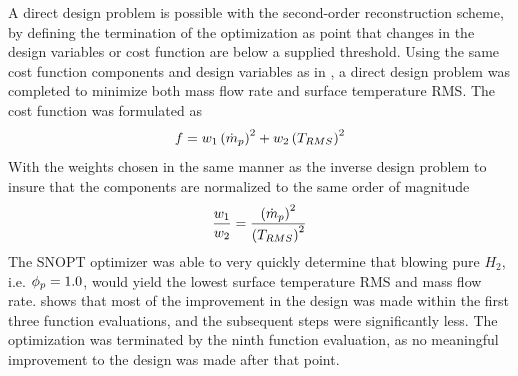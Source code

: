 A direct design problem is possible with the second-order reconstruction scheme,
by defining the termination of the optimization as point that changes in the
design variables or cost function are below a supplied threshold.  Using the
same cost function components and design variables as in ,
a direct design problem was completed to minimize both mass flow rate and
surface temperature RMS.  The cost function was formulated as
\begin{equation}
  f = w_1\left( \dot{m}_p \right)^2 + w_2\left( T_{RMS} \right)^2
  \label{direct-design-cost-func}
\end{equation}
With the weights chosen in the same manner as the inverse design problem to
insure that the components are normalized to the same order of magnitude
\begin{equation}
  \frac{w_1}{w_2} = \frac{\left( \dot{m}_p \right)^2}{\left( T_{RMS} \right)^2}
  \label{direct-design-weights}
\end{equation}
The SNOPT optimizer was able to very quickly determine that blowing pure
$H_2$, i.e. $\phi_p = 1.0$, would yield the lowest surface temperature RMS and mass
flow rate.   shows that most of the improvement in
the design was made within the first three function evaluations, and the
subsequent steps were significantly less.  The optimization was terminated by
the ninth function evaluation, as no meaningful improvement to the design was
made after that point.
